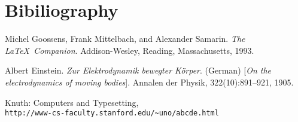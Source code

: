 \documentclass{article}
\begin{document}
\section{ Bibiliography}



\begin{thebibliography}{9}
Michel Goossens, Frank Mittelbach, and Alexander Samarin. 
\textit{The \LaTeX\ Companion}. 
Addison-Wesley, Reading, Massachusetts, 1993.
 
Albert Einstein. 
\textit{Zur Elektrodynamik bewegter K{\"o}rper}. (German) 
[\textit{On the electrodynamics of moving bodies}]. 
Annalen der Physik, 322(10):891–921, 1905.
 
Knuth: Computers and Typesetting,
\\\texttt{http://www-cs-faculty.stanford.edu/\~{}uno/abcde.html}
\end{thebibliography}



 
\end{document}
